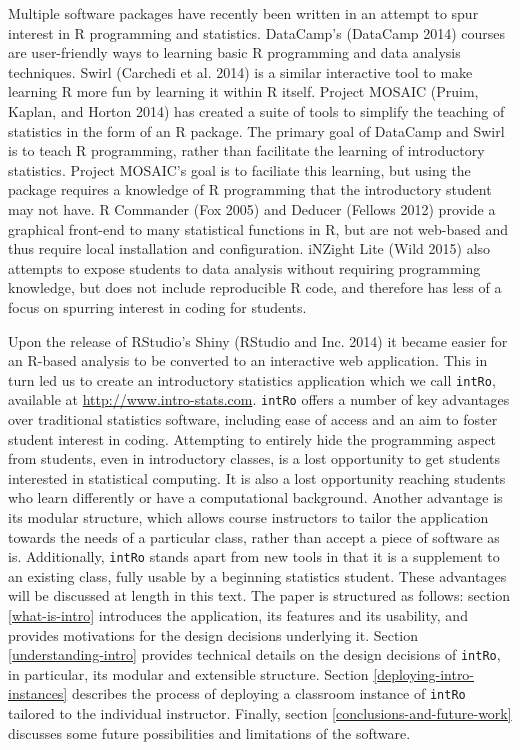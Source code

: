 \documentclass[12pt,]{article}
\begin{document}
Multiple software packages have recently been written in an attempt to
spur interest in R programming and statistics. DataCamp's (DataCamp
2014) courses are user-friendly ways to learning basic R programming and
data analysis techniques. Swirl (Carchedi et al. 2014) is a similar
interactive tool to make learning R more fun by learning it within R
itself. Project MOSAIC (Pruim, Kaplan, and Horton 2014) has created a
suite of tools to simplify the teaching of statistics in the form of an
R package. The primary goal of DataCamp and Swirl is to teach R
programming, rather than facilitate the learning of introductory
statistics. Project MOSAIC's goal is to faciliate this learning, but
using the package requires a knowledge of R programming that the
introductory student may not have. R Commander (Fox 2005) and Deducer
(Fellows 2012) provide a graphical front-end to many statistical
functions in R, but are not web-based and thus require local
installation and configuration. iNZight Lite (Wild 2015) also attempts
to expose students to data analysis without requiring programming
knowledge, but does not include reproducible R code, and therefore has
less of a focus on spurring interest in coding for students.

Upon the release of RStudio's Shiny (RStudio and Inc. 2014) it became
easier for an R-based analysis to be converted to an interactive web
application. This in turn led us to create an introductory statistics
application which we call \texttt{intRo}, available at
\url{http://www.intro-stats.com}. \texttt{intRo} offers a number of key
advantages over traditional statistics software, including ease of
access and an aim to foster student interest in coding. Attempting to
entirely hide the programming aspect from students, even in introductory
classes, is a lost opportunity to get students interested in statistical
computing. It is also a lost opportunity reaching students who learn
differently or have a computational background. Another advantage is its
modular structure, which allows course instructors to tailor the
application towards the needs of a particular class, rather than accept
a piece of software as is. Additionally, \texttt{intRo} stands apart
from new tools in that it is a supplement to an existing class, fully
usable by a beginning statistics student. These advantages will be
discussed at length in this text. The paper is structured as follows:
section \ref{what-is-intro} introduces the application, its features and
its usability, and provides motivations for the design decisions
underlying it. Section \ref{understanding-intro} provides technical
details on the design decisions of \texttt{intRo}, in particular, its
modular and extensible structure. Section
\ref{deploying-intro-instances} describes the process of deploying a
classroom instance of \texttt{intRo} tailored to the individual
instructor. Finally, section \ref{conclusions-and-future-work} discusses
some future possibilities and limitations of the software.
\end{document}

